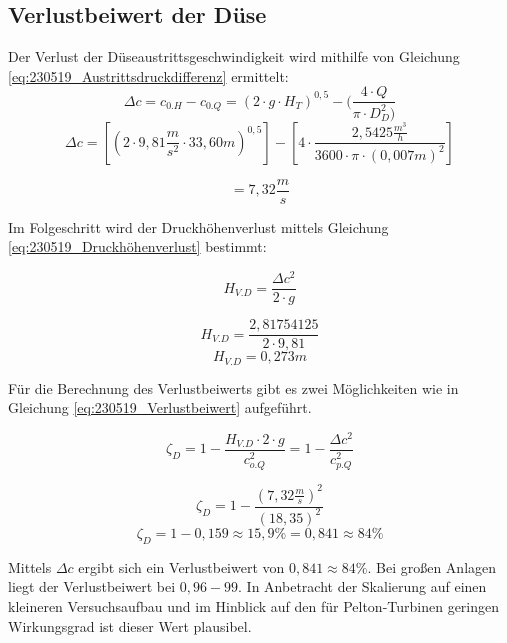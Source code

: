 \subsection{Verlustbeiwert der Düse}

Der Verlust der Düseaustrittsgeschwindigkeit wird mithilfe von Gleichung \autoref{eq:230519_Austrittsdruckdifferenz} ermittelt:
\begin{equation}
\Delta c = c_{0.H} - c_{0.Q} = ( 2\cdot g \cdot H_T)^{0,5} - (\frac{4\cdot Q}{\pi \cdot D_D^2)}
\label{eq:230519_Austrittsdruckdifferenz}
\end{equation}
$$\Delta c =[( 2\cdot 9,81 \frac{m}{s^2} \cdot 33,60m
)^{0,5}] -[ 4\cdot \frac{2,5425\frac{m^3}{h}}{3600\cdot \pi \cdot (0,007m)^2}] $$

$$ =7,32 \frac{m}{s}$$

Im Folgeschritt wird der Druckhöhenverlust mittels Gleichung \autoref{eq:230519_Druckhöhenverlust} bestimmt:

\begin{equation}
H_{V.D} = \frac{\Delta c^2}{2\cdot g}
\label{eq:230519_Druckhöhenverlust}
\end{equation}

$$ H_{V.D} = \frac{2,81754125}{2\cdot 9,81} $$
$$ H_{V.D} = 0,273m $$

Für die Berechnung des Verlustbeiwerts gibt es zwei Möglichkeiten wie in Gleichung \autoref{eq:230519_Verlustbeiwert} aufgeführt.

\begin{equation}
\zeta_D =1 - \frac{H_{V.D} \cdot 2 \cdot g}{c_{o.Q}^2}= 1 - \frac{\Delta c^2}{c_{p.Q}^2}
\label{eq:230519_Verlustbeiwert}
\end{equation}

$$\zeta_{D} = 1 - \frac{(7,32\frac{m}{s})^2}{(18,35)^2}$$
$$ \zeta_{D} = 1 - 0,159 \approx 15,9\% = 0,841 \approx 84\% $$

Mittels $\Delta c$ ergibt sich ein Verlustbeiwert von $0,841 \approx 84\%$.
Bei großen Anlagen liegt der Verlustbeiwert bei $0,96-99$. 
In Anbetracht der Skalierung auf einen kleineren Versuchsaufbau und im Hinblick auf den für Pelton-Turbinen geringen Wirkungsgrad ist dieser Wert plausibel.
